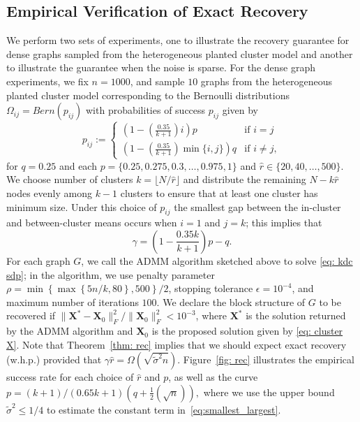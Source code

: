 \documentclass[twoside,11pt]{article}
\newcommand{\bs}{\boldsymbol}
\newcommand{\X}{\bs {X}}
\newcommand{\0}{\bs{0}}
\newcommand{\rbra}[1]{\ensuremath{\left( #1 \right)}} %
\newcommand{\bra}[1]{\ensuremath{\left\{ #1 \right\}}} %
\newcommand{\half}{\frac{1}{2}}
\begin{document}
{\subsection{Empirical Verification of Exact Recovery}

We perform two sets of experiments, one to illustrate the recovery guarantee for dense graphs sampled from the heterogeneous planted cluster model and another to illustrate the guarantee
when the noise is sparse.
For the dense graph experiments, we fix \(n = 1000\), and sample \(10\) graphs
from the heterogeneous planted cluster model corresponding to the Bernoulli
distributions \(\Omega_{ij} = Bern(p_{ij})\)  with probabilities of success $p_{ij}$ given by
\[
	p_{ij} := \begin{cases} \rbra{ 1 - \rbra{\frac{0.35}{k+1}}i } p &\text{if } i = j \\
								\rbra{ 1 - \rbra{\frac{0.35}{k+1}} \min\{i,j\} } q &\text{if } i \neq j,
							\end{cases}
\]
for $q = 0.25$ and each $p=\{0.25, 0.275, 0.3, \dots, 0.975, 1\}$ and
\(\hat r \in \{20, 40, \dots, 500\}\).
We choose number of clusters $k=\lfloor N/\hat r \rfloor$
and distribute the remaining $N - k\hat r$ nodes
evenly among $k-1$ clusters to ensure that at least one cluster
has minimum size.
Under this choice of $p_{ij}$ the smallest gap between the in-cluster and between-cluster means occurs when $i=1$ and $j = k$; this implies that
\begin{equation}\label{eq: het gam}
	\gamma = \rbra{ 1 - \frac{0.35 k }{k+1}}p - q.
\end{equation}
For each graph \(G\), we call the ADMM algorithm sketched above to solve \eqref{eq: kdc sdp};
in the algorithm, we use penalty parameter \(\rho = \min \bra{ \max \bra{ 5n/k, 80}, 500}/2 \),
stopping tolerance \(\epsilon = 10^{-4}\), and maximum number of iterations \(100\).
We declare the block structure of \(G\) to be recovered if \(\|\X^* - \X_0\|^2_F / \|\X_0\|^2_F < 10^{-3} \),
where \(\X^* \) is the solution returned by the ADMM algorithm and \(\X_0\) is the proposed solution
given by \eqref{eq: cluster X}.
Note that Theorem~\ref{thm: rec} implies that we should expect exact recovery (w.h.p.) provided that
$
	\gamma \hat r = \Omega\rbra{\sqrt{\tilde \sigma^2n}}.
$
Figure~\ref{fig: rec} illustrates the empirical success rate for each choice of \(\hat r\) and \(p\), as well as the curve \( p =(k+1)/(0.65k + 1)(q + \half\rbra{\sqrt{n}}),\) where we use the upper bound $\tilde \sigma^2 \le 1/4$ to estimate the constant term in~\eqref{eq:smallest_largest}.

}
\end{document}
